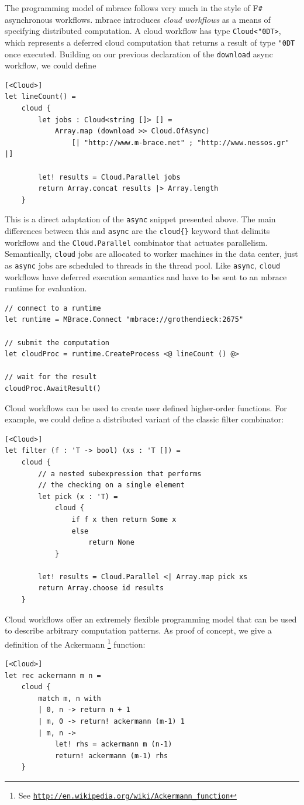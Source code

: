 \documentclass[9pt,a4paper]{article}
\newcommand{\mbrace}{mbrace}
\newcommand{\Mbrace}{\mbrace}
\newcommand{\fsharp}{F\texttt \#}
\newcommand{\samehref}[1]{\href{#1}{\texttt{#1}}}
\newcommand{\uq}{\char"0D}
\begin{document}
The programming model of \mbrace{} follows very much in the style of \fsharp{} 
asynchronous workflows. \Mbrace{} introduces \emph{cloud workflows}
as a means of specifying distributed computation.
A cloud workflow has type \texttt{Cloud<\uq{}T>}, which represents a
deferred cloud computation that returns a result of type \texttt{\uq{}T} once executed.
Building on our previous declaration of the \texttt{download} async workflow, we could define
\begin{lstlisting}
[<Cloud>]
let lineCount() = 
	cloud {
    	let jobs : Cloud<string []> [] = 
        	Array.map (download >> Cloud.OfAsync) 
				[| "http://www.m-brace.net" ; "http://www.nessos.gr" |]

	    let! results = Cloud.Parallel jobs
    	return Array.concat results |> Array.length
	}
\end{lstlisting}
This is a direct adaptation of the \texttt{async} snippet presented above.
The main differences between this and \texttt{async} 
are the \texttt{cloud\{\}} keyword that delimits workflows
and the \texttt{Cloud.Parallel} combinator that actuates parallelism.
Semantically, \texttt{cloud} jobs are allocated to worker machines in the data center, 
just as \texttt{async} jobs are scheduled to threads in the thread pool. 
Like \texttt{async}, \texttt{cloud} workflows have deferred execution semantics 
and have to be sent to an \mbrace{} runtime for evaluation.
\begin{lstlisting}
// connect to a runtime
let runtime = MBrace.Connect "mbrace://grothendieck:2675"

// submit the computation
let cloudProc = runtime.CreateProcess <@ lineCount () @>

// wait for the result
cloudProc.AwaitResult()
\end{lstlisting}
%
%
Cloud workflows can be used to create user defined higher-order functions. 
For example, we could define a distributed variant of the classic filter combinator:
\begin{lstlisting}
[<Cloud>]
let filter (f : 'T -> bool) (xs : 'T []) =
    cloud {
		// a nested subexpression that performs
		// the checking on a single element
		let pick (x : 'T) =
			cloud {
				if f x then return Some x
				else
					return None
			}

        let! results = Cloud.Parallel <| Array.map pick xs
		return Array.choose id results
    }
\end{lstlisting}
%
%
Cloud workflows offer an extremely flexible programming model that can
be used to describe arbitrary computation patterns.
As proof of concept, we give a definition of the Ackermann%
\footnote{See \samehref{http://en.wikipedia.org/wiki/Ackermann\_function}} function:
\begin{lstlisting}
[<Cloud>]
let rec ackermann m n =
    cloud {
        match m, n with
        | 0, n -> return n + 1
        | m, 0 -> return! ackermann (m-1) 1
        | m, n ->
            let! rhs = ackermann m (n-1)
            return! ackermann (m-1) rhs
    }
\end{lstlisting}
%
\end{document}
